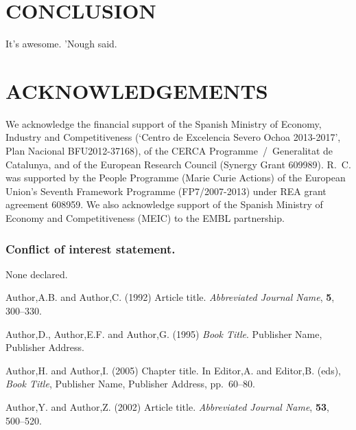 \documentclass[a4,center,fleqn]{NAR}
\begin{document}
\section{CONCLUSION}

It's awesome. 'Nough said.


\section{ACKNOWLEDGEMENTS}

We acknowledge the financial support of the Spanish Ministry of Economy,
Industry and Competitiveness (`Centro de Excelencia Severo Ochoa
2013-2017', Plan Nacional BFU2012-37168), of the CERCA
Programme~/~Generalitat de Catalunya, and of the European Research Council
(Synergy Grant 609989). R.~C. was supported by the People Programme
(Marie Curie Actions) of the European Union's Seventh Framework Programme
(FP7/2007-2013) under REA grant agreement 608959. We also acknowledge
support of the Spanish Ministry of Economy and Competitiveness (MEIC) to
the EMBL partnership.


\subsubsection{Conflict of interest statement.} None declared.
\newpage


\begin{thebibliography}{4}

Author,A.B. and Author,C. (1992)
Article title.
\textit{Abbreviated Journal Name}, \textbf{5}, 300--330.

Author,D., Author,E.F. and Author,G. (1995)
\textit{Book Title}.
Publisher Name, Publisher Address.

Author,H. and Author,I. (2005)
Chapter title.
In
Editor,A. and Editor,B. (eds),
\textit{Book Title},
Publisher Name, Publisher Address,
pp.\ 60--80.

Author,Y. and Author,Z. (2002)
Article title.
\textit{Abbreviated Journal Name}, \textbf{53}, 500--520.

\end{thebibliography}
\end{document}
